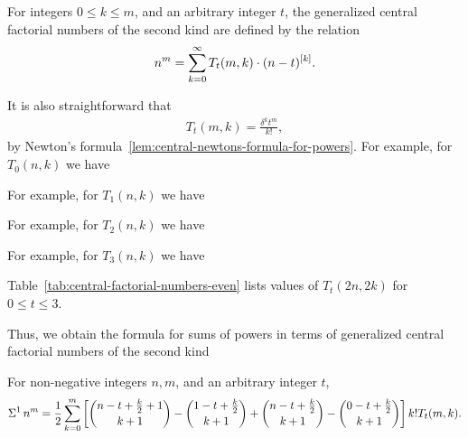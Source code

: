 \begin{definition}
  \label{def:generalized-central-factorial-numbers}
  For integers $0 \leq k \leq m$, and an arbitrary integer $t$, the generalized
  central factorial numbers of the second kind are defined by the relation
  \begin{align*}
    n^m = \sum_{k=0}^{\infty} T_t(m,k) \cdot (n-t)^{[k]}.
  \end{align*}
\end{definition}
It is also straightforward that
\begin{align*}
  T_t (m,k) = \frac{\delta^{k} t^m}{k!},
\end{align*}
by Newton's
formula~\eqref{lem:central-newtons-formula-for-powers}.
For example, for $T_0(n,k)$ we have

For example, for $T_1(n,k)$ we have

For example, for $T_2(n,k)$ we have

For example, for $T_3(n,k)$ we have

Table~\ref{tab:central-factorial-numbers-even} lists values of $T_t(2n,2k)$ for $0 \leq t \leq 3$.


Thus, we obtain the formula for sums of powers in terms of
generalized central factorial numbers of the second kind

\begin{proposition}
  \label{prop:generalized-central-factorial-sums}
  For non-negative integers $n,m$, and an arbitrary integer $t$,
  \begin{align*}
    \Sigma^{1}\,{n}^{m} = \frac{1}{2} \sum_{k=0}^{m}
    \left[
      \binom{n -t + \frac{k}{2} +1}{k+1} - \binom{1 -t + \tfrac{k}{2}}{k+1}
      + \binom{n -t + \frac{k}{2}}{k+1} - \binom{0-t + \tfrac{k}{2}}{k+1}
    \right] k! T_t (m,k).
  \end{align*}
\end{proposition}
